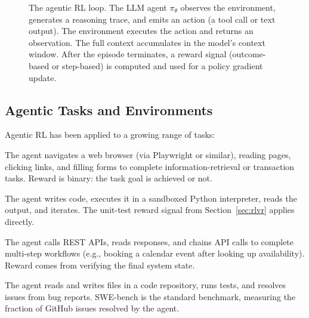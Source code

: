 \begin{figure}[ht]
\caption{The agentic RL loop. The LLM agent $\pi_\theta$ observes the
  environment, generates a reasoning trace, and emits an action (a
  tool call or text output). The environment executes the action and
  returns an observation. The full context accumulates in the model's
  context window. After the episode terminates, a reward signal
  (outcome-based or step-based) is computed and used for a policy
  gradient update.}
\label{fig:agent-loop}
\end{figure}

\subsection{Agentic Tasks and Environments}
\label{subsec:agentic-tasks}

Agentic RL has been applied to a growing range of tasks:

\begin{description}[leftmargin=!,labelwidth=3.5cm]
\item[Web browsing] The agent navigates a web browser (via Playwright
  or similar), reading pages, clicking links, and filling forms to
  complete information-retrieval or transaction tasks. Reward is
  binary: the task goal is achieved or not.

\item[Code execution] The agent writes code, executes it in a
  sandboxed Python interpreter, reads the output, and iterates. The
  unit-test reward signal from Section~\ref{sec:rlvr} applies
  directly.

\item[API interaction] The agent calls REST APIs, reads responses,
  and chains API calls to complete multi-step workflows (e.g., booking
  a calendar event after looking up availability). Reward comes from
  verifying the final system state.

\item[Repository-level coding] The agent reads and writes files in a
  code repository, runs tests, and resolves issues from bug reports.
  SWE-bench is the standard benchmark, measuring
  the fraction of GitHub issues resolved by the agent.
\end{description}

